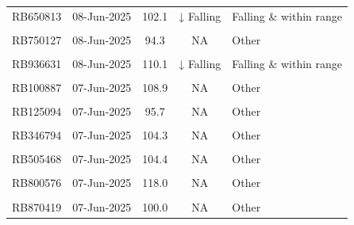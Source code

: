 \documentclass[
]{article}
\begin{document}
\begin{table}[!h]
\begin{tabular}[t]{lcccl}
RB650813 & 08-Jun-2025 & 102.1 & ↓ Falling & Falling \& within range\\
\cellcolor{gray!10}{RB677480} & \cellcolor{gray!10}{08-Jun-2025} & \cellcolor{gray!10}{105.1} & \cellcolor{gray!10}{NA} & \cellcolor{gray!10}{Other}\\
\addlinespace
RB750127 & 08-Jun-2025 & 94.3 & NA & Other\\
\cellcolor{gray!10}{RB833880} & \cellcolor{gray!10}{08-Jun-2025} & \cellcolor{gray!10}{113.5} & \cellcolor{gray!10}{↑ Rising} & \cellcolor{gray!10}{Rising \& within range}\\
RB936631 & 08-Jun-2025 & 110.1 & ↓ Falling & Falling \& within range\\
\cellcolor{gray!10}{RB986113} & \cellcolor{gray!10}{08-Jun-2025} & \cellcolor{gray!10}{106.1} & \cellcolor{gray!10}{↓ Falling} & \cellcolor{gray!10}{Falling \& within range}\\
RB100887 & 07-Jun-2025 & 108.9 & NA & Other\\
\addlinespace
\cellcolor{gray!10}{RB104146} & \cellcolor{gray!10}{07-Jun-2025} & \cellcolor{gray!10}{110.8} & \cellcolor{gray!10}{NA} & \cellcolor{gray!10}{Other}\\
RB125094 & 07-Jun-2025 & 95.7 & NA & Other\\
\cellcolor{gray!10}{RB295892} & \cellcolor{gray!10}{07-Jun-2025} & \cellcolor{gray!10}{113.3} & \cellcolor{gray!10}{NA} & \cellcolor{gray!10}{Other}\\
RB346794 & 07-Jun-2025 & 104.3 & NA & Other\\
\cellcolor{gray!10}{RB455582} & \cellcolor{gray!10}{07-Jun-2025} & \cellcolor{gray!10}{108.8} & \cellcolor{gray!10}{NA} & \cellcolor{gray!10}{Other}\\
\addlinespace
RB505468 & 07-Jun-2025 & 104.4 & NA & Other\\
\cellcolor{gray!10}{RB758417} & \cellcolor{gray!10}{07-Jun-2025} & \cellcolor{gray!10}{119.0} & \cellcolor{gray!10}{↑ Rising} & \cellcolor{gray!10}{Rising \& within range}\\
RB800576 & 07-Jun-2025 & 118.0 & NA & Other\\
\cellcolor{gray!10}{RB841991} & \cellcolor{gray!10}{07-Jun-2025} & \cellcolor{gray!10}{120.1} & \cellcolor{gray!10}{↑ Rising} & \cellcolor{gray!10}{Rising \& outside range}\\
RB870419 & 07-Jun-2025 & 100.0 & NA & Other\\
\bottomrule
\end{tabular}
\end{table}
\end{document}
